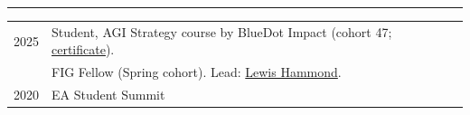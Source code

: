 \hrule %
\vspace{2mm}

\begin{longtable}[l]{@{}p{} p{}}

    2025 & Student, AGI Strategy course by BlueDot Impact (cohort 47; \href{https://bluedot.org/certification?id=recqYVY6U3zjNA1xw}{certificate}). \vspace{1mm} \\
    & FIG Fellow (Spring cohort). Lead: \href{https://lewishammond.com/}{Lewis Hammond}. \vspace{3mm} \\
    2020 & EA Student Summit
\end{longtable}